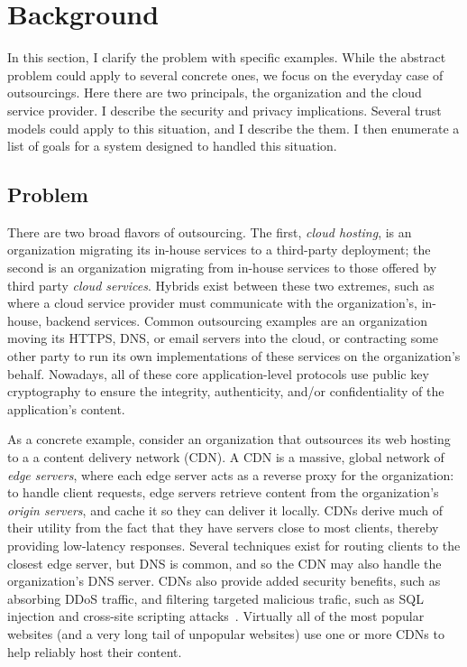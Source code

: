 \section{Background}
\label{sec:background}

In this section, I clarify the problem with specific examples.
%
While the abstract problem could apply to several concrete ones, we focus on
the everyday case of outsourcings.
%
Here there are two principals, the organization and the cloud service provider.
%
I describe the security and privacy implications.
%
Several trust models could apply to this situation, and I describe the them.
%
I then enumerate a list of goals for a system designed to handled this
situation.


\subsection{Problem}

There are two broad flavors of outsourcing.
%
The first, \emph{cloud hosting}, is an organization migrating its in-house
services to a third-party deployment; the second is an organization  migrating
from in-house services to those offered by third party \emph{cloud services}.
%
Hybrids exist between these two extremes, such as where a cloud service
provider must communicate with the organization's, in-house, backend services.
%
Common outsourcing examples are an organization moving its HTTPS, DNS, or
email servers into the cloud, or contracting some other party to run its own
implementations of these services on the organization's behalf.
%
Nowadays, all of these core application-level protocols use public key
cryptography to ensure the integrity, authenticity, and/or confidentiality of
the application's content.


As a concrete example, consider an organization that outsources its web hosting
to a a content delivery network (CDN)\@.
%
A CDN is a massive, global network of \emph{edge servers}, where each edge
server acts as a reverse proxy for the organization: to
handle client requests, edge servers retrieve content from the organization's
\emph{origin servers}, and cache it so they can deliver it locally.
%
CDNs derive much of their utility from the fact that they have servers close to
most clients, thereby providing low-latency responses.
%
Several techniques exist for routing clients to the closest edge server, but
DNS is common, and so the CDN may also handle the organization's DNS server.
%
CDNs also provide added security benefits, such as absorbing DDoS
traffic, and filtering targeted malicious trafic, such as SQL injection and
cross-site scripting attacks~\cite{securing-cdns}.
%
Virtually all of the most popular websites (and a very long tail of unpopular
websites) use one or more CDNs to help reliably host their content.


